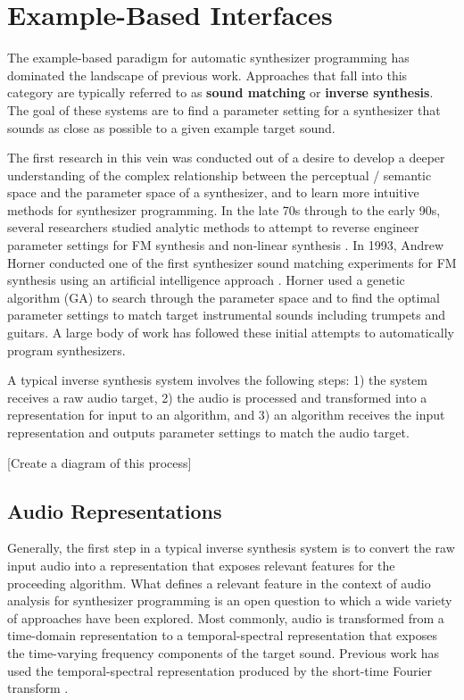 \section{Example-Based Interfaces}
\label{sec:asp-example-based}
The example-based paradigm for automatic synthesizer programming has dominated the landscape of previous work. Approaches that fall into this category are typically referred to as \textbf{sound matching} or \textbf{inverse synthesis}. The goal of these systems are to find a parameter setting for a synthesizer that sounds as close as possible to a given example target sound. 

The first research in this vein was conducted out of a desire to develop a deeper understanding of the complex relationship between the perceptual / semantic space and the parameter space of a synthesizer, and to learn more intuitive methods for synthesizer programming. In the late 70s through to the early 90s, several researchers studied analytic methods to attempt to reverse engineer parameter settings for FM synthesis \cite{justice1979analytic, beauchamp1982synthesis, payne1987microcomputer} and non-linear synthesis \cite{delprat1990parameter}. In 1993, Andrew Horner conducted one of the first synthesizer sound matching experiments for FM synthesis using an artificial intelligence approach \cite{horner1993machine}. Horner used a genetic algorithm (GA) to search through the parameter space and to find the optimal parameter settings to match target instrumental sounds including trumpets and guitars. A large body of work has followed these initial attempts to automatically program synthesizers.

A typical inverse synthesis system involves the following steps: 1) the system receives a raw audio target, 2) the audio is processed and transformed into a representation for input to an algorithm, and 3) an algorithm receives the input representation and outputs parameter settings to match the audio target.

[Create a diagram of this process]

\subsection{Audio Representations}
Generally, the first step in a typical inverse synthesis system is to convert the raw input audio into a representation that exposes relevant features for the proceeding algorithm. What defines a relevant feature in the context of audio analysis for synthesizer programming is an open question to which a wide variety of approaches have been explored. Most commonly, audio is transformed from a time-domain representation to a temporal-spectral representation that exposes the time-varying frequency components of the target sound. Previous work has used the temporal-spectral representation produced by the short-time Fourier transform \cite{horner1995wavetable, horner1995envelope, horner1996piecewise, chinen2007genesynth, yee2007evolving, barkan2019inversynth}. 

